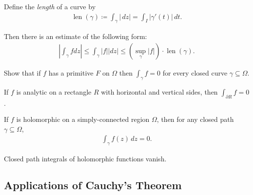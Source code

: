 \begin{proposition}

Define the \emph{length} of a curve by
\begin{align*}
\operatorname{len}(\gamma) \coloneqq\int_\gamma {\left\lvert {\,dz} \right\rvert} = \int_I {\left\lvert {\gamma'(t)} \right\rvert} \,dt
.\end{align*}

Then there is an estimate of the following form:
\begin{align*}
\left|\int_{\gamma} f d z\right| \leq \int_{\gamma}|f||d z| \leq\left(\sup _{\gamma}|f|\right) \cdot \operatorname{len}(\gamma)
.\end{align*}

\end{proposition}

\begin{exercise}

Show that if \(f\) has a primitive \(F\) on \(\Omega\) then
\(\int_\gamma f = 0\) for every closed curve
\(\gamma \subseteq \Omega\).

\end{exercise}

\begin{theorem}[Goursat]

If \(f\) is analytic on a rectangle \(R\) with horizontal and vertical
sides, then \(\int_{{{\partial}}R} f = 0\).

\end{theorem}

\begin{theorem}\label{CauchyTheorem}

If \(f\) is holomorphic on a simply-connected region \(\Omega\), then
for any closed path \(\gamma \subseteq \Omega\),
\begin{align*}  
\int_{\gamma} f(z) \,dz= 0
.\end{align*}

\end{theorem}

\begin{slogan}

Closed path integrals of holomorphic functions vanish.

\end{slogan}

\hypertarget{applications-of-cauchys-theorem}{%
\subsection{Applications of Cauchy's
Theorem}\label{applications-of-cauchys-theorem}}

